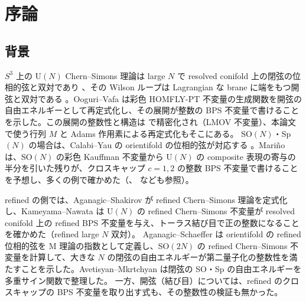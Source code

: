 \section{序論}\label{sec:intro}

\subsection{背景}
$S^3$ 上の U$(N)$ Chern--Simons 理論は large $N$ で resolved conifold 上の閉弦の位相的弦と双対であり \cite{GV98}、その Wilson ループは Lagrangian な brane に端をもつ開弦と双対である \cite{OV99}。Ooguri--Vafa \cite{OV99} は彩色 HOMFLY-PT 不変量の生成関数を開弦の自由エネルギーとして再定式化し、その展開が整数の BPS 不変量で書けることを示した。この展開の整数性と構造は \cite{LM00,LMV00,LM01} で精密化され（LMOV 不変量）、本論文で使う行列 $M$ と Adams 作用素による再定式化もそこにある。
SO$(N)$・Sp$(N)$ の場合は、Calabi--Yau の orientifold の位相的弦が対応する \cite{SV00}。Mariño \cite{Marino09} は、SO$(N)$ の彩色 Kauffman 不変量から U$(N)$ の composite 表現の寄与の半分を引いた残りが、クロスキャップ $c = 1, 2$ の整数 BPS 不変量で書けることを予想し、多くの例で確かめた（\cite{BFM04,BFM05}、\cite{NRZ13} なども参照）。

refined の側では、Aganagic--Shakirov \cite{AgSh11} が refined Chern--Simons 理論を定式化し、Kameyama--Nawata \cite{KN17} は U$(N)$ の refined Chern--Simons 不変量が resolved conifold 上の refined BPS 不変量を与え、トーラス結び目で正の整数になることを確かめた（refined large $N$ 双対）。
Aganagic--Schaeffer \cite{AgSc12} は orientifold の refined 位相的弦を M 理論の指数として定義し、SO$(2N)$ の refined Chern--Simons 不変量を計算して、大きな $N$ の閉弦の自由エネルギーが第二量子化の整数性を満たすことを示した。Avetisyan--Mkrtchyan \cite{AM22} は閉弦の SO・Sp の自由エネルギーを多重サイン関数で整理した。
一方、開弦（結び目）については、refined のクロスキャップの BPS 不変量を取り出す式も、その整数性の検証も無かった。

